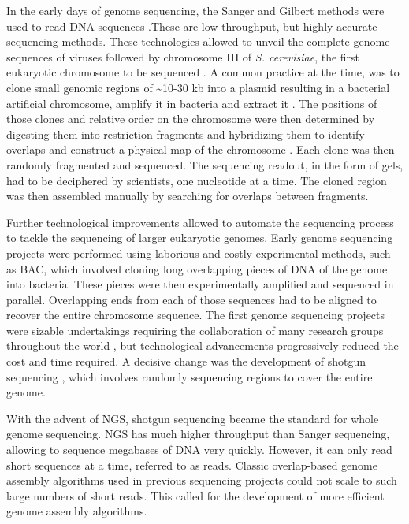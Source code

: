In the early days of genome sequencing, the Sanger and Gilbert methods were used to read DNA sequences \cite{sangerDNASequencingChainterminating1977,maxamNewMethodSequencing1977}.These are low throughput, but highly accurate sequencing methods. These technologies allowed to unveil the complete genome sequences of viruses \citep{sangerNucleotideSequenceBacteriophage1982,baerDNASequenceExpression1984,vanwezenbeekNucleotideSequenceFilamentous1980} followed by chromosome III of \textit{S. cerevisiae}, the first eukaryotic chromosome to be sequenced \cite{oliverCompleteDNASequence1992}. A common practice at the time, was to clone small genomic regions of \textasciitilde 10-30 kb into a plasmid resulting in a bacterial artificial chromosome, amplify it in bacteria and extract it \cite{thierryCompleteSequenceKb1990}. The positions of those clones and relative order on the chromosome were then determined by digesting them into restriction fragments and hybridizing them to identify overlaps and construct a physical map of the chromosome \cite{mcphersonPhysicalMapHuman2001}. Each clone was then randomly fragmented and sequenced. The sequencing readout, in the form of gels, had to be deciphered by scientists, one nucleotide at a time. The cloned region was then assembled manually by searching for overlaps between fragments.

Further technological improvements allowed to automate the sequencing process to tackle the sequencing of larger eukaryotic genomes. Early genome sequencing projects were performed using laborious and costly experimental methods, such as \acrfull{BAC}, which involved cloning long overlapping pieces of DNA of the genome into bacteria. These pieces were then experimentally amplified and sequenced in parallel. Overlapping ends from each of those sequences had to be aligned to recover the entire chromosome sequence. The first genome sequencing projects were sizable undertakings requiring the collaboration of many research groups throughout the world \citep{collinsNewFiveyearPlan1993,adamsGenomeSequenceDrosophila2000,oliverCompleteDNASequence1992}, but technological advancements progressively reduced the cost and time required. A decisive change was the development of shotgun sequencing \cite{venterSequenceHumanGenome2001}, which involves randomly sequencing regions to cover the entire genome.

With the advent of \acrfull{NGS}, shotgun sequencing became the standard for whole genome sequencing. \acrshort{NGS} has much higher throughput than Sanger sequencing, allowing to sequence megabases of DNA very quickly. However, it can only read short sequences at a time, referred to as \Gls{read}s. Classic overlap-based genome assembly algorithms used in previous sequencing projects could not scale to such large numbers of short reads. This called for the development of more efficient genome assembly algorithms.

